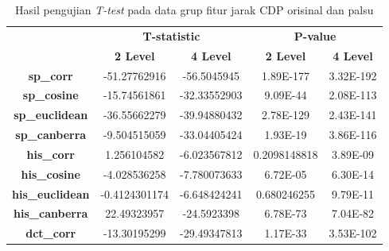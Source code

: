 \begin{table}[!ht]
	\centering
	\caption{Hasil pengujian \emph{T-test} pada data grup fitur jarak CDP orisinal dan palsu}
	\vspace{0.5em}
	\begin{tabular}{|c|cc|cc|}
		\hline
		\multirow{2}{*}{}       & \multicolumn{2}{c|}{\textbf{T-statistic}} & \multicolumn{2}{c|}{\textbf{P-value}}                                                            \\ \cline{2-5}
		                        & \multicolumn{1}{c|}{\textbf{2 Level}}     & \textbf{4 Level}                      & \multicolumn{1}{c|}{\textbf{2 Level}} & \textbf{4 Level} \\ \hline
		\textbf{sp\_corr}       & \multicolumn{1}{c|}{-51.27762916}         & -56.5045945                           & \multicolumn{1}{c|}{1.89E-177}        & 3.32E-192        \\ \hline
		\textbf{sp\_cosine}     & \multicolumn{1}{c|}{-15.74561861}         & -32.33552903                          & \multicolumn{1}{c|}{9.09E-44}         & 2.08E-113        \\ \hline
		\textbf{sp\_euclidean}  & \multicolumn{1}{c|}{-36.55662279}         & -39.94880432                          & \multicolumn{1}{c|}{2.78E-129}        & 2.43E-141        \\ \hline
		\textbf{sp\_canberra}   & \multicolumn{1}{c|}{-9.504515059}         & -33.04405424                          & \multicolumn{1}{c|}{1.93E-19}         & 3.86E-116        \\ \hline
		\textbf{his\_corr}      & \multicolumn{1}{c|}{1.256104582}          & -6.023567812                          & \multicolumn{1}{c|}{0.2098148818}     & 3.89E-09         \\ \hline
		\textbf{his\_cosine}    & \multicolumn{1}{c|}{-4.028536258}         & -7.780073633                          & \multicolumn{1}{c|}{6.72E-05}         & 6.30E-14         \\ \hline
		\textbf{his\_euclidean} & \multicolumn{1}{c|}{-0.4124301174}        & -6.648424241                          & \multicolumn{1}{c|}{0.680246255}      & 9.79E-11         \\ \hline
		\textbf{his\_canberra}  & \multicolumn{1}{c|}{22.49323957}          & -24.5923398                           & \multicolumn{1}{c|}{6.78E-73}         & 7.04E-82         \\ \hline
		\textbf{dct\_corr}      & \multicolumn{1}{c|}{-13.30195299}         & -29.49347813                          & \multicolumn{1}{c|}{1.17E-33}         & 3.53E-102        \\ \hline

\end{tabular}
\end{table}
